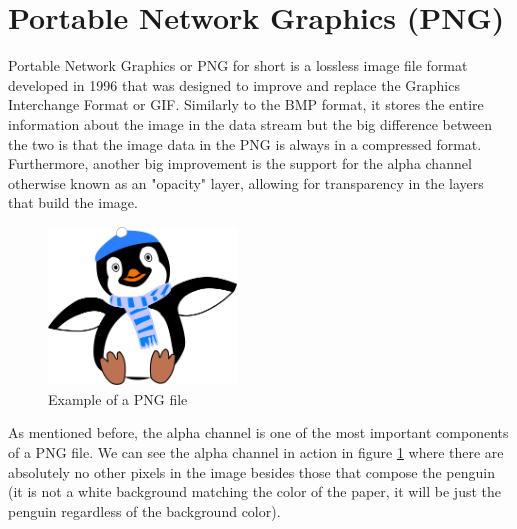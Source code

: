 \section{Portable Network Graphics (PNG)} \label{PNG_Explained_Chapter}
Portable Network Graphics or PNG for short is a lossless image file format developed in 1996 that was designed to improve and replace the Graphics Interchange Format or GIF\cite{rfc2083}. Similarly to the BMP format, it stores the entire information about the image in the data stream but the big difference between the two is that the image data in the PNG is always in a compressed format. Furthermore, another big improvement is the support for the alpha channel otherwise known as an "opacity" layer, allowing for transparency in the layers that build the image.

\begin{figure}[H]
    \centering
    \includegraphics[width=5cm,keepaspectratio]{pics/png_chapter/png_file_example}
    \caption{Example of a PNG file}
    \label{png:example}
\end{figure}

As mentioned before, the alpha channel is one of the most important components of a PNG file. We can see the alpha channel in action in figure \ref{png:example} where there are absolutely no other pixels in the image besides those that compose the penguin (it is not a white background matching the color of the paper, it will be just the penguin regardless of the background color). 

